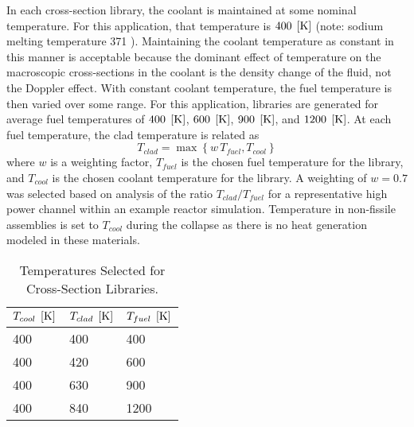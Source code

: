  In each cross-section library, the coolant is maintained at some nominal
  temperature. For this application, that temperature is $400 \;\left[\text{{K}}\right]$
  (note: sodium melting temperature 371 ). Maintaining the coolant
  temperature as constant in this manner is acceptable because the dominant 
  effect of temperature on the macroscopic cross-sections in the coolant is 
  the density change of the fluid, not the Doppler effect. With constant 
  coolant temperature, the fuel temperature is then varied over some range. 
  For this application, libraries are generated for average fuel temperatures
  of $400 \;\left[\text{{K}}\right]$, $600 \;\left[\text{{K}}\right]$, $900 \;\left[\text{{K}}\right]$, and $1200 \;\left[\text{{K}}\right]$.
  At each fuel temperature, the clad temperature is related as 
  \begin{equation}
    T_{clad} = \max \left\{ w \, T_{fuel}, T_{cool} \right\}
  \end{equation}
  where $w$ is a weighting factor, $T_{fuel}$ is the chosen fuel temperature
  for the library, and $T_{cool}$ is the chosen coolant temperature for the
  library. A weighting of $w=0.7$ was selected based on analysis of the ratio
  $T_{clad}/T_{fuel}$ for a representative high power channel
  within an example reactor simulation.  Temperature in non-fissile assemblies 
  is set to $T_{cool}$ during the collapse as there is no heat generation 
  modeled in these materials.

  \begin{table}
    \caption{Temperatures Selected for Cross-Section Libraries.}
    \label{tab:xstemps}
    \begin{center}
      \begin{tabular}{lll}
        \toprule
        $T_{cool} \;\left[\text{{K}}\right]$ & $T_{clad} \;\left[\text{{K}}\right]$ & $T_{fuel} \;\left[\text{{K}}\right]$ \\
        \midrule
        400 & 400 & 400  \\
        400 & 420 & 600  \\
        400 & 630 & 900  \\
        400 & 840 & 1200 \\
        \bottomrule
      \end{tabular}
    \end{center}
  \end{table}

